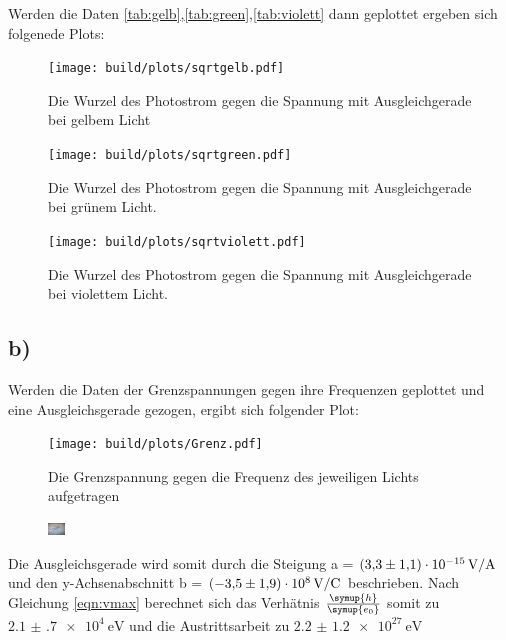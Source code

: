     \noindent
    Werden die Daten \ref{tab:gelb},\ref{tab:green},\ref{tab:violett} dann geplottet ergeben sich folgenede Plots:
    \noindent

    \begin{figure}[H]
        \centering
        \texttt{[image: build/plots/sqrtgelb.pdf]}
        \caption{Die Wurzel des Photostrom gegen die Spannung mit Ausgleichgerade bei gelbem Licht}
        \label{img:sqrtgelb}
    \end{figure}

    \begin{figure}[H]
        \centering
        \texttt{[image: build/plots/sqrtgreen.pdf]}
        \caption{Die Wurzel des Photostrom gegen die Spannung mit Ausgleichgerade bei grünem Licht.}
        \label{img:sqrtgruen}
    \end{figure}

    \begin{figure}[H]
        \centering
        \texttt{[image: build/plots/sqrtviolett.pdf]}
        \caption{Die Wurzel des Photostrom gegen die Spannung mit Ausgleichgerade bei violettem Licht.}
        \label{img:sqrtviolett}
    \end{figure}

\subsection{b)}

    \noindent
    Werden die Daten der Grenzspannungen gegen ihre Frequenzen geplottet und eine Ausgleichsgerade gezogen, ergibt sich folgender Plot:
    \noindent

    \begin{figure}[H]
        \centering
        \texttt{[image: build/plots/Grenz.pdf]}
        \caption{Die Grenzspannung gegen die Frequenz des jeweiligen Lichts aufgetragen}
        \label{img:gegen}
    \end{figure}

    \begin{figure}[H]
        \centering
        \includegraphics[width=0.04\textwidth]{latex/images/meme.PNG}
    \end{figure}

    \noindent
    Die Ausgleichsgerade wird somit durch die Steigung a = $\SI{3.3 (11)e-15}{\volt\per\ampere}$ und den y-Achsenabschnitt 
    b = $\SI{-3.5 (19)e8}{\volt\per\coulomb}$ beschrieben.
    Nach Gleichung \ref{eqn:vmax} berechnet sich das Verhätnis $\frac{\symup{h}}{\symup{e_0}}$ somit zu $\SI{2.1(7)e4}{\electronvolt}$ und die 
    Austrittsarbeit zu $\SI{2.2(12)e27}{\electronvolt}$
    \noindent

